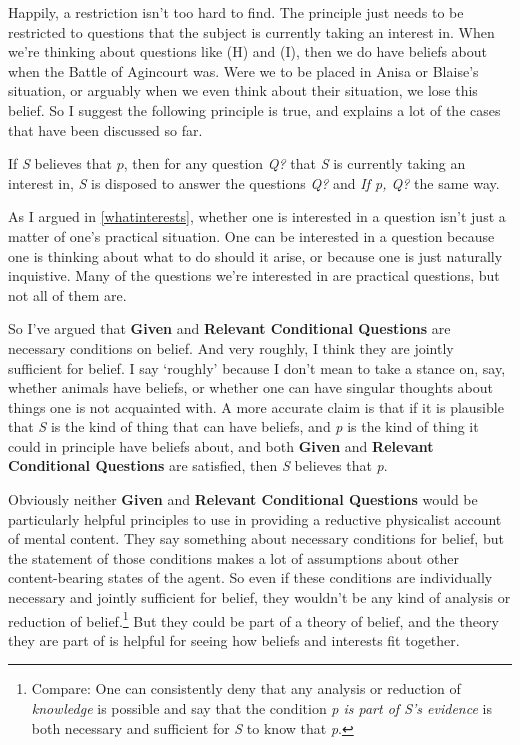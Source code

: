 \documentclass[11pt,]{book}
\providecommand{\tightlist}{%
  \setlength{\itemsep}{0pt}\setlength{\parskip}{0pt}}
\let\rmarkdownfootnote\footnote%
\def\footnote{\protect\rmarkdownfootnote}
\begin{document}
Happily, a restriction isn't too hard to find. The principle just needs to be restricted to questions that the subject is currently taking an interest in. When we're thinking about questions like (H) and (I), then we do have beliefs about when the Battle of Agincourt was. Were we to be placed in Anisa or Blaise's situation, or arguably when we even think about their situation, we lose this belief. So I suggest the following principle is true, and explains a lot of the cases that have been discussed so far.

\begin{description}
\tightlist
\item[Relevant Conditional Questions]
If \emph{S} believes that \(p\), then for any question \emph{Q?} that \emph{S} is currently taking an interest in, \emph{S} is disposed to answer the questions \emph{Q?} and \emph{If p, Q?} the same way.
\end{description}

As I argued in \ref{whatinterests}, whether one is interested in a question isn't just a matter of one's practical situation. One can be interested in a question because one is thinking about what to do should it arise, or because one is just naturally inquistive. Many of the questions we're interested in are practical questions, but not all of them are.

So I've argued that \textbf{Given} and \textbf{Relevant Conditional Questions} are necessary conditions on belief. And very roughly, I think they are jointly sufficient for belief. I say `roughly' because I don't mean to take a stance on, say, whether animals have beliefs, or whether one can have singular thoughts about things one is not acquainted with. A more accurate claim is that if it is plausible that \emph{S} is the kind of thing that can have beliefs, and \emph{p} is the kind of thing it could in principle have beliefs about, and both \textbf{Given} and \textbf{Relevant Conditional Questions} are satisfied, then \emph{S} believes that \emph{p}.

Obviously neither \textbf{Given} and \textbf{Relevant Conditional Questions} would be particularly helpful principles to use in providing a reductive physicalist account of mental content. They say something about necessary conditions for belief, but the statement of those conditions makes a lot of assumptions about other content-bearing states of the agent. So even if these conditions are individually necessary and jointly sufficient for belief, they wouldn't be any kind of analysis or reduction of belief.\footnote{Compare: One can consistently deny that any analysis or reduction of \emph{knowledge} is possible and say that the condition \emph{p is part of S's evidence} is both necessary and sufficient for \emph{S} to know that \emph{p}.} But they could be part of a theory of belief, and the theory they are part of is helpful for seeing how beliefs and interests fit together.
\end{document}

